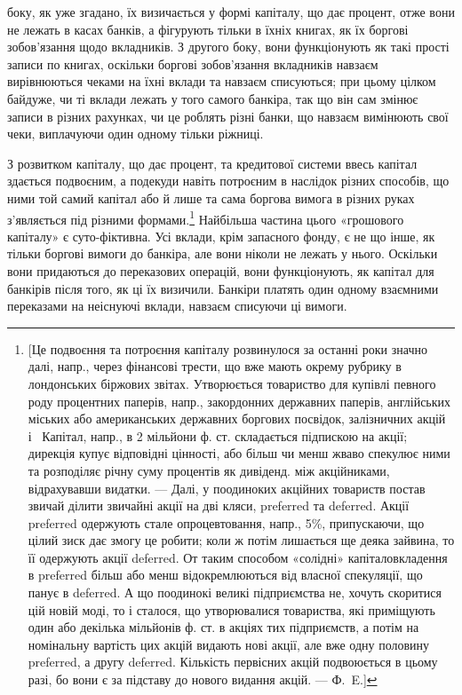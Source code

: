 \parcont{}  %
боку, як уже згадано, їх визичається у формі капіталу, що дає процент, отже
вони не лежать в касах банків, а фігурують тільки в їхніх книгах, як їх боргові
зобов’язання щодо вкладників. З другого боку, вони функціонують як такі прості
записи по книгах, оскільки боргові зобов’язання вкладників навзаєм вирівнюються
чеками на їхні вклади та навзаєм списуються; при цьому цілком байдуже,
чи ті вклади лежать у того самого банкіра, так що він сам змінює записи
в різних рахунках, чи це роблять різні банки, що навзаєм вимінюють свої
чеки, виплачуючи один одному тільки ріжниці.

З розвитком капіталу, що дає процент, та кредитової системи ввесь капітал
здається подвоєним, а подекуди навіть потроєним в наслідок різних способів,
що ними той самий капітал або й лише та сама боргова вимога в різних
руках з’являється під різними формами.\footnote{
[Це подвоєння та потроєння капіталу розвинулося за останні роки значно далі, напр., через
фінансові трести, що вже мають окрему рубрику в лондонських біржових звітах. Утворюється товариство
для купівлі певного роду процентних паперів, напр., закордонних державних паперів, англійських
міських або американських державних боргових посвідок, залізничних акцій і~ Капітал,
напр., в 2 мільйони ф. ст. складається підпискою на акції; дирекція купує відповідні цінності, або
більш чи менш жваво спекулює ними та розподіляє річну суму процентів як дивіденд. між акційниками,
відрахувавши видатки. — Далі, у поодиноких акційних товариств постав звичай ділити звичайні акції
на дві кляси, preferred та deferred. Акції preferred одержують стале опроцевтовання, напр., 5\%,
припускаючи, що цілий зиск дає змогу це робити; коли ж потім лишається ще деяка зайвина, то її
одержують акції deferred. От таким способом «солідні» капіталовкладення в preferred більш або менш
відокремлюються від власної спекуляції, що панує в deferred. А що поодинокі великі підприємства
не, хочуть скоритися цій новій моді, то і сталося, що утворювалися товариства, які приміщують один
або декілька мільйонів ф. ст. в акціях тих підприємств, а потім на номінальну вартість цих акцій
видають
нові акції, але вже одну половину preferred, а другу deferred. Кількість первісних акцій подвоюється
в цьому разі, бо вони є за підставу до нового видання акцій. — Ф.~E.]
} Найбільша частина цього «грошового
капіталу» є суто-фіктивна. Усі вклади, крім запасного фонду, є не що інше,
як тільки боргові вимоги до банкіра, але вони ніколи не лежать у нього. Оскільки
вони придаються до переказових операцій, вони функціонують, як капітал для
банкірів після того, як ці їх визичили. Банкіри платять один одному взаємними
переказами на неіснуючі вклади, навзаєм списуючи ці вимоги.

